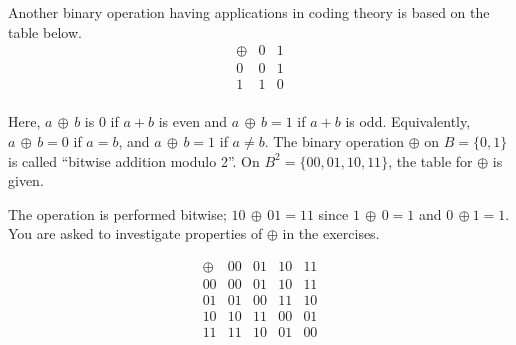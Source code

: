 \documentclass[12pt]{article}
\theoremstyle{definition}
\begin{document}
Another binary operation having applications in coding theory is based on the table below.\\[.1in]
$$\begin{array}{c|cc}
\oplus & 0 & 1\\
\hline
0 & 0 & 1\\
1 & 1 & 0\\
\end{array}$$
\rule{0in}{.1in}
Here, $a\,\oplus\,b$ is 0 if $a+b$ is even and $a\,\oplus\,b=1$ if $a+b$ is odd.  Equivalently, $a\,\oplus\,b=0$ if $a=b$, and $a\,\oplus\,b=1$ if $a\neq b$.  The binary operation $\oplus$ on $B=\{0,1\}$ is called ``bitwise addition modulo 2''.  On $B^2=\{00,01,10,11\}$, the table for $\oplus$ is given. \\[.1in]
\begin{minipage}{3.5 in}
The operation is performed bitwise; $10\,\oplus\,01=11$ since $1\,\oplus\,0=1$ and $0\,\oplus 1 =1$.  You are asked to investigate properties of $\oplus$ in the exercises.
\end{minipage}
\begin{minipage}{3.5in}
$$\begin{array}{c|cccc}
\oplus& 00 & 01 & 10 & 11\\
\hline
00 & 00 & 01 & 10 & 11\\
01 & 01 & 00 & 11 & 10\\
10 & 10 & 11 & 00 & 01\\
11 & 11 & 10 & 01 & 00
\end{array}$$
\end{minipage}
\end{document}
